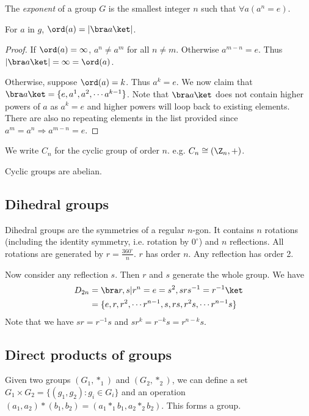 \documentclass[a4pape]{article}
\begin{document}
\begin{defi}
  The \emph{exponent} of a group $G$ is the smallest integer $n$ such that $\forall a(a^n = e)$.
\end{defi}
\begin{lemma}
  For $a$ in $g$, $\ord (a) = |\bra a\ket|$.
\end{lemma}
\begin{proof}
  If $\ord (a) = \infty$, $a^n \not= a^m$ for all $n\not= m$. Otherwise $a^{m-n} = e$. Thus $|\bra a\ket| = \infty = \ord (a)$.

Otherwise, suppose $\ord (a) = k$. Thus $a^k = e$. We now claim that $\bra a\ket = \{e, a^1, a^2, \cdots a^{k-1}\}$. Note that $\bra a\ket$ does not contain higher powers of $a$ as $a^k = e$ and higher powers will loop back to existing elements. There are also no repeating elements in the list provided since $a^m = a^n \Rightarrow a^{m-n} = e$.
\end{proof}

\begin{notation}
  We write $C_n$ for the cyclic group of order $n$. e.g. $C_n \cong (\Z_n, +)$.
\end{notation}

\begin{prop}
  Cyclic groups are abelian.
\end{prop}

\subsection{Dihedral groups}
\begin{defi}
  Dihedral groups are the symmetries of a regular $n$-gon. It contains $n$ rotations (including the identity symmetry, i.e. rotation by $0^\circ$) and $n$ reflections. All rotations are generated by $r = \frac{360^\circ}{n}$. $r$ has order $n$. Any reflection has order 2.

Now consider any reflection $s$. Then $r$ and $s$ generate the whole group. We have
\begin{align*}
 D_{2n} &= \bra r, s|r^n=e=s^2, srs^{-1} = r^{-1}\ket\\
  &= \{e, r, r^2, \cdots r^{n-1}, s, rs, r^2s, \cdots r^{n-1}s\}
\end{align*}
Note that we have $sr=r^{-1}s$ and $sr^k = r^{-k}s = r^{n-k}s$.
\end{defi}

\subsection{Direct products of groups}
\begin{defi}
  Given two groups $(G_1, *_1)$ and $(G_2, *_2)$, we can define a set $G_1\times G_2 = \{(g_1, g_2): g_i\in G_i\}$ and an operation $(a_1, a_2)*(b_1, b_2) = (a_1*_1b_1, a_2*_2b_2)$. This forms a group.
\end{defi}
\end{document}

